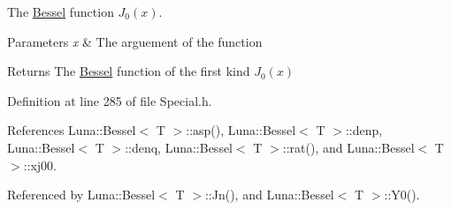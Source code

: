 The \hyperlink{structLuna_1_1Bessel}{Bessel} function $ J_0(x) $. 


\begin{DoxyParams}{Parameters}
{\em x} & The arguement of the function \\
\hline
\end{DoxyParams}
\begin{DoxyReturn}{Returns}
The \hyperlink{structLuna_1_1Bessel}{Bessel} function of the first kind $ J_0(x) $ 
\end{DoxyReturn}


Definition at line 285 of file Special.\+h.



References Luna\+::\+Bessel$<$ T $>$\+::asp(), Luna\+::\+Bessel$<$ T $>$\+::denp, Luna\+::\+Bessel$<$ T $>$\+::denq, Luna\+::\+Bessel$<$ T $>$\+::rat(), and Luna\+::\+Bessel$<$ T $>$\+::xj00.



Referenced by Luna\+::\+Bessel$<$ T $>$\+::\+Jn(), and Luna\+::\+Bessel$<$ T $>$\+::\+Y0().


